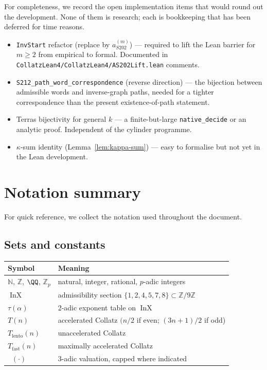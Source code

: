 \documentclass[11pt,a4paper]{article}
\theoremstyle{plain}
\theoremstyle{definition}
\newcommand{\NN}{\mathbb{N}}
\newcommand{\ZZ}{\mathbb{Z}}
\newcommand{\Zp}[1]{\mathbb{Z}_{#1}}
\newcommand{\aSat}{a_{S202}^{(m)}}
\DeclareMathOperator{\InX}{InX}
\DeclareMathOperator{\nuthree}{\nu_3}
\begin{document}
For completeness, we record the open implementation items that
would round out the development. None of them is research; each
is bookkeeping that has been deferred for time reasons.

\begin{itemize}
  \item \texttt{InvStart} refactor (replace by $\aSat$) — required
        to lift the Lean barrier for $m \ge 2$ from empirical to
        formal. Documented in
        \texttt{CollatzLean4/CollatzLean4/AS202Lift.lean} comments.
  \item \texttt{S212\_path\_word\_correspondence} (reverse direction)
        — the bijection between admissible words and inverse-graph
        paths, needed for a tighter correspondence than the present
        existence-of-path statement.
  \item Terras bijectivity for general $k$ — a finite-but-large
        \texttt{native\_decide} or an analytic proof. Independent
        of the cylinder programme.
  \item $\kappa$-sum identity (Lemma~\ref{lem:kappa-sum}) — easy to
        formalise but not yet in the Lean development.
\end{itemize}

\section{Notation summary}\label{app:notation}

For quick reference, we collect the notation used throughout the
document.

\subsection*{Sets and constants}

\begin{center}\footnotesize
\begin{tabular}{ll}
\toprule
Symbol & Meaning \\
\midrule
$\NN$, $\ZZ$, $\QQ$, $\Zp{p}$ & natural, integer, rational, $p$-adic integers \\
$\InX$ & admissibility section $\{1, 2, 4, 5, 7, 8\} \subset \ZZ/9\ZZ$ \\
$\tau(\alpha)$ & 2-adic exponent table on $\InX$ \\
$T(n)$ & accelerated Collatz $(n / 2$ if even; $(3n+1)/2$ if odd) \\
$T_{\mathrm{lento}}(n)$ & unaccelerated Collatz \\
$T_{\mathrm{fast}}(n)$ & maximally accelerated Collatz \\
$\nuthree(\cdot)$ & 3-adic valuation, capped where indicated \\
\bottomrule
\end{tabular}
\end{center}
\end{document}
